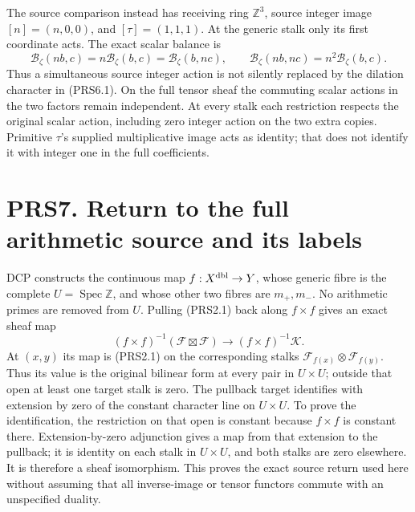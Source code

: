 The source comparison instead has receiving ring \(\mathbb Z^3\), source
integer image \([n]=(n,0,0)\), and \([\tau]=(1,1,1)\). At the generic
stalk only its first coordinate acts. The exact scalar balance is \[
\mathcal B_\zeta(nb,c)=n\mathcal B_\zeta(b,c)=\mathcal B_\zeta(b,nc),\qquad
\mathcal B_\zeta(nb,nc)=n^2\mathcal B_\zeta(b,c).
\tag{PRS6.2}
\] Thus a simultaneous source integer action is not silently replaced by
the dilation character in (PRS6.1). On the full tensor sheaf the
commuting scalar actions in the two factors remain independent. At every
stalk each restriction respects the original scalar action, including
zero integer action on the two extra copies. Primitive \(\tau\)'s
supplied multiplicative image acts as identity; that does not identify
it with integer one in the full coefficients.

\section{PRS7. Return to the full arithmetic source and its
labels}\label{prs7.-return-to-the-full-arithmetic-source-and-its-labels}

DCP constructs the continuous map \(f:X^{\rm dbl}\to Y\), whose generic
fibre is the complete \(U=\operatorname{Spec}\mathbb Z\), and whose
other two fibres are \(m_+,m_-\). No arithmetic primes are removed from
\(U\). Pulling (PRS2.1) back along \(f\times f\) gives an exact sheaf
map \[
(f\times f)^{-1}(\mathcal F\boxtimes\mathcal F)
\longrightarrow(f\times f)^{-1}\mathcal K.
\tag{PRS7.1}
\] At \((x,y)\) its map is (PRS2.1) on the corresponding stalks
\(\mathcal F_{f(x)}\otimes\mathcal F_{f(y)}\). Thus its value is the
original bilinear form at every pair in \(U\times U\); outside that open
at least one target stalk is zero. The pullback target identifies with
extension by zero of the constant character line on \(U\times U\). To
prove the identification, the restriction on that open is constant
because \(f\times f\) is constant there. Extension-by-zero adjunction
gives a map from that extension to the pullback; it is identity on each
stalk in \(U\times U\), and both stalks are zero elsewhere. It is
therefore a sheaf isomorphism. This proves the exact source return used
here without assuming that all inverse-image or tensor functors commute
with an unspecified duality.

